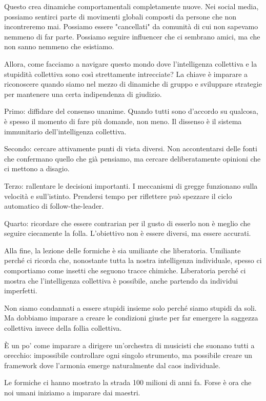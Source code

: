Questo crea dinamiche comportamentali completamente nuove. Nei social media, possiamo sentirci parte di movimenti globali composti da persone che non incontreremo mai. Possiamo essere "cancellati" da comunità di cui non sapevamo nemmeno di far parte. Possiamo seguire influencer che ci sembrano amici, ma che non sanno nemmeno che esistiamo.

\medskip

Allora, come facciamo a navigare questo mondo dove l'intelligenza collettiva e la stupidità collettiva sono così strettamente intrecciate? La chiave è imparare a riconoscere quando siamo nel mezzo di dinamiche di gruppo e sviluppare strategie per mantenere una certa indipendenza di giudizio.

Primo: diffidare del consenso unanime. Quando tutti sono d'accordo su qualcosa, è spesso il momento di fare più domande, non meno. Il dissenso è il sistema immunitario dell'intelligenza collettiva.

Secondo: cercare attivamente punti di vista diversi. Non accontentarsi delle fonti che confermano quello che già pensiamo, ma cercare deliberatamente opinioni che ci mettono a disagio.

Terzo: rallentare le decisioni importanti. I meccanismi di gregge funzionano sulla velocità e sull'istinto. Prendersi tempo per riflettere può spezzare il ciclo automatico di follow-the-leader.

Quarto: ricordare che essere contrarian per il gusto di esserlo non è meglio che seguire ciecamente la folla. L'obiettivo non è essere diversi, ma essere accurati.

\bigskip

Alla fine, la lezione delle formiche è sia umiliante che liberatoria. Umiliante perché ci ricorda che, nonostante tutta la nostra intelligenza individuale, spesso ci comportiamo come insetti che seguono tracce chimiche. Liberatoria perché ci mostra che l'intelligenza collettiva è possibile, anche partendo da individui imperfetti.

Non siamo condannati a essere stupidi insieme solo perché siamo stupidi da soli. Ma dobbiamo imparare a creare le condizioni giuste per far emergere la saggezza collettiva invece della follia collettiva.

È un po' come imparare a dirigere un'orchestra di musicisti che suonano tutti a orecchio: impossibile controllare ogni singolo strumento, ma possibile creare un framework dove l'armonia emerge naturalmente dal caos individuale.

Le formiche ci hanno mostrato la strada 100 milioni di anni fa. Forse è ora che noi umani iniziamo a imparare dai maestri.